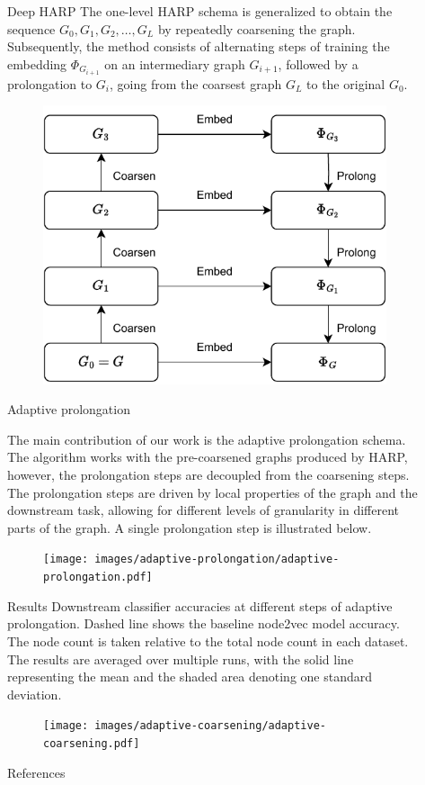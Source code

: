 \documentclass{beamer}
\newlength{\sepwidth}
\newlength{\colwidth}
\newcommand{\separatorcolumn}{\begin{column}{\sepwidth}\end{column}}
\begin{document}
\begin{frame}[t]
\begin{columns}[t]
	\separatorcolumn

	\begin{column}{\colwidth}
		\begin{block}{Deep HARP}
			The one-level HARP schema is generalized to obtain the sequence \( G_0, G_1, G_2, \dots, G_L \) by repeatedly coarsening the graph. Subsequently, the method consists of alternating steps of training the embedding \( \Phi_{G_{i + 1}} \) on an intermediary graph \( G_{i + 1} \), followed by a prolongation to \( G_{i} \), going from the coarsest graph \( G_L \) to the original \( G_0 \).
			\begin{figure}
				\includegraphics[width=0.45\linewidth]{images/deep-harp/deep-harp.pdf}
			\end{figure}
		\end{block}

		\begin{block}{Adaptive prolongation}

			The main contribution of our work is the adaptive prolongation schema. The algorithm works with the pre-coarsened graphs produced by HARP, however, the prolongation steps are decoupled from the coarsening steps. The prolongation steps are driven by local properties of the graph and the downstream task, allowing for different levels of granularity in different parts of the graph. A single prolongation step is illustrated below.

			\begin{figure}
				\texttt{[image: images/adaptive-prolongation/adaptive-prolongation.pdf]}
			\end{figure}
		\end{block}

		\begin{block}{Results}
			Downstream classifier accuracies at different steps of adaptive prolongation. Dashed line shows the baseline node2vec model accuracy. The node count is taken relative to the total node count in each dataset. The results are averaged over multiple runs, with the solid line representing the mean and the shaded area denoting one standard deviation.
			\begin{figure}
				\texttt{[image: images/adaptive-coarsening/adaptive-coarsening.pdf]}
			\end{figure}
		\end{block}

		\begin{block}{References}
			\printbibliography
		\end{block}
	\end{column}

	\separatorcolumn
\end{columns}

\end{frame}
\end{document}
